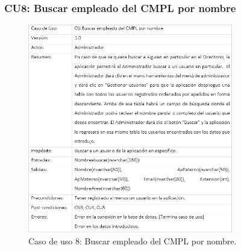 		\subsubsection{CU8: Buscar empleado del CMPL por nombre}
			\begin{figure}[htbp!]
				\centering
					\includegraphics[width=0.8\textwidth]{images/CU/CU8}
					\caption{Caso de uso 8: Buscar empleado del CMPL por nombre.}
				\label{Tabla}
			\end{figure}
			
